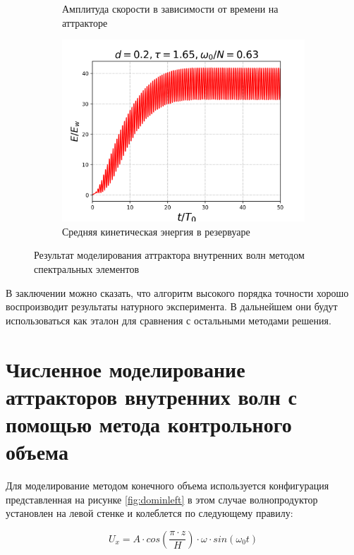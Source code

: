 \begin{figure}[!ht]
\begin{subfigure}[с]{0.45\textwidth}
        \caption{Амплитуда скорости в зависимости от времени на аттракторе}
    \end{subfigure}
    \begin{subfigure}[с]{0.45\textwidth}
        \includegraphics[scale=0.4]{pics/H40L60N1ap02dp20w0p63/2D36x36DiagramH40L60N1ap02dp20w0p63totKEnonDim.png}
        \caption{Средняя кинетическая энергия в резервуаре}
    \end{subfigure}
    
    \caption{Результат моделирования аттрактора внутренних волн методом спектральных элементов}

\end{figure}

В заключении можно сказать, что алгоритм высокого порядка точности хорошо воспроизводит результаты натурного эксперимента. В дальнейшем они будут использоваться как эталон для сравнения с остальными методами решения. 

\section{Численное моделирование аттракторов внутренних волн с помощью метода контрольного объема}

Для моделирование методом конечного объема используется конфигурация представленная на рисунке \ref{fig:dominleft} в этом случае волнопродуктор установлен на левой стенке и колеблется по следующему правилу:

\begin{equation}
    U_x = A\cdot cos\left(\frac{\pi \cdot z}{H}\right)\cdot \omega \cdot  sin(\omega_0 t)
\end{equation}

